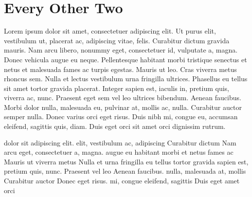 \documentclass{article}
\begin{document}
\newpage

\section{Every Other Two}
\begin{minipage}[t]{.5\textwidth}
Lorem ipsum dolor sit amet, consectetuer adipiscing elit. Ut purus
elit, vestibulum ut, placerat ac, adipiscing vitae, felis. Curabitur
dictum gravida mauris. Nam arcu libero, nonummy eget, consectetuer
id, vulputate a, magna. Donec vehicula augue eu neque. Pellentesque
habitant morbi tristique senectus et netus et malesuada fames ac
turpis egestas. Mauris ut leo. Cras viverra metus rhoncus sem. Nulla
et lectus vestibulum urna fringilla ultrices. Phasellus eu tellus
sit amet tortor gravida placerat. Integer sapien est, iaculis in,
pretium quis, viverra ac, nunc. Praesent eget sem vel leo ultrices
bibendum. Aenean faucibus. Morbi dolor nulla, malesuada eu, pulvinar
at, mollis ac, nulla. Curabitur auctor semper nulla.  Donec varius orci
eget risus. Duis nibh mi, congue eu, accumsan eleifend, sagittis quis,
diam. Duis eget orci sit amet orci dignissim rutrum.
\end{minipage}
\begin{minipage}[t]{.5\textwidth}
 dolor sit 
adipiscing elit.  elit, vestibulum  ac, adipiscing  Curabitur dictum
 Nam arcu  eget,
consectetuer  a, magna.  augue eu  habitant morbi
 et netus 
fames ac  Mauris ut 
viverra metus  Nulla et  urna fringilla  eu tellus
 tortor gravida 
sapien est,  pretium quis,  nunc. Praesent  vel leo  Aenean faucibus.  nulla, malesuada
 at, mollis  Curabitur
auctor   Donec  eget
risus.  mi, congue  eleifend,
sagittis  Duis eget  amet orci
\end{minipage}
\end{document}
